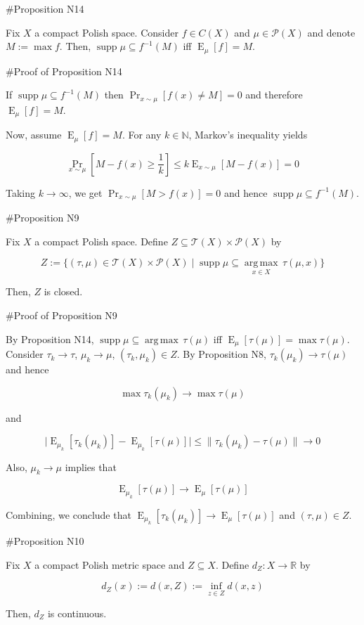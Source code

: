 \documentclass[a4paper]{article}
\DeclareMathOperator{\Supp}{supp}
\DeclareMathOperator{\Prb}{Pr}
\DeclareMathOperator{\E}{E}
\newcommand{\Argmax}[1]{\underset{#1}{\operatorname{arg\,max}}\,}
\newcommand{\Nats}{\mathbb{N}}
\newcommand{\Reals}{\mathbb{R}}
\newcommand{\Abs}[1]{\lvert #1 \rvert}
\newcommand{\Norm}[1]{\lVert #1 \rVert}
\newcommand{\Prob}{\mathcal{P}}
\newcommand{\T}{\mathcal{T}}
\begin{document}
\#Proposition N14

Fix ${X}$ a compact Polish space. Consider ${f \in C(X)}$ and ${\mu \in \Prob(X)}$ and denote ${M := \max f}$. Then, ${\Supp \mu \subseteq f^{-1}(M)}$ iff ${\E_\mu[f] = M}$.

\#Proof of Proposition N14

If ${\Supp \mu \subseteq f^{-1}(M)}$ then $\Prb_{x\sim \mu}[f(x) \ne M] = 0$ and therefore ${\E_\mu[f] = M}$.

Now, assume ${\E_\mu[f] = M}$. For any ${k \in \Nats}$, Markov's inequality yields 

$$\Prb_{x\sim \mu}[M - f(x) \geq \frac{1}{k}] \leq k\E_{x \sim \mu}[M - f(x)] = 0$$

Taking $k \rightarrow \infty$, we get ${\Prb_{x\sim \mu}[M > f(x)] = 0}$ and hence ${\Supp \mu \subseteq f^{-1}(M)}$.

\#Proposition N9

Fix ${X}$ a compact Polish space. Define ${Z \subseteq \T(X) \times \Prob(X)}$ by

$$Z:=\{(\tau,\mu) \in \T(X) \times \Prob(X) \mid \Supp \mu \subseteq \Argmax{x \in X} \tau(\mu,x)\}$$

Then, ${Z}$ is closed.

\#Proof of Proposition N9

By Proposition N14, $\Supp \mu \subseteq \Argmax{} \tau(\mu)$ iff ${\E_\mu[\tau(\mu)]=\max \tau(\mu)}$. Consider ${\tau_k \rightarrow \tau}$, ${\mu_k \rightarrow \mu}$, ${(\tau_k,\mu_k) \in Z}$. By Proposition N8, ${\tau_k(\mu_k) \rightarrow \tau(\mu)}$ and hence 

$${\max \tau_k(\mu_k) \rightarrow \max \tau(\mu)}$$

and 

$$\Abs{\E_{\mu_k}[\tau_k(\mu_k)] - \E_{\mu_k}[\tau(\mu)]} \leq \Norm{\tau_k(\mu_k) - \tau(\mu)}  \rightarrow 0$$

Also, ${\mu_k \rightarrow \mu}$ implies that

$$\E_{\mu_k}[\tau(\mu)] \rightarrow \E_{\mu}[\tau(\mu)]$$

Combining, we conclude that $\E_{\mu_k}[\tau_k(\mu_k)] \rightarrow \E_{\mu}[\tau(\mu)]$ and ${(\tau,\mu) \in Z}$.

\#Proposition N10

Fix ${X}$ a compact Polish metric space and ${Z \subseteq X}$. Define ${d_Z: X \rightarrow \Reals}$ by 

$${d_Z(x):=d(x,Z):=\inf_{z \in Z} d(x,z)}$$

Then, ${d_Z}$ is continuous.
\end{document}
